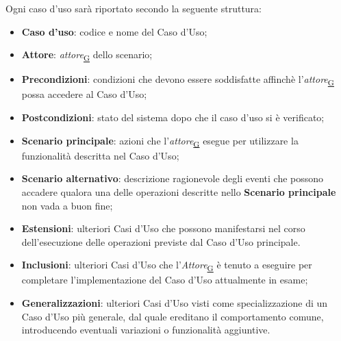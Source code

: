 ﻿\documentclass[a4paper,12pt]{article}
\begin{document}
{{      Ogni caso d'uso sarà riportato secondo la seguente struttura:
      \begin{itemize}
          \item \textbf{Caso d'uso}: codice e nome del Caso d'Uso;
          \item \textbf{Attore}: \textit{attore}\textsubscript{\href{https://atlasteam9.github.io/Atlas/glossario.html\#Attore}{G}} dello scenario;
          \item \textbf{Precondizioni}: condizioni che devono essere soddisfatte affinchè l'\textit{attore}\textsubscript{\href{https://atlasteam9.github.io/Atlas/glossario.html\#Attore}{G}} possa accedere al Caso d'Uso;
          \item \textbf{Postcondizioni}: stato del sistema dopo che il caso d'uso si è verificato;
          \item \textbf{Scenario principale}: azioni che l'\textit{attore}\textsubscript{\href{https://atlasteam9.github.io/Atlas/glossario.html\#Attore}{G}} esegue per utilizzare la funzionalità descritta nel Caso d'Uso;
          \item \textbf{Scenario alternativo}: descrizione ragionevole degli eventi che possono accadere qualora una delle operazioni descritte nello \textbf{Scenario principale} non vada a buon fine;
          \item \textbf{Estensioni}: ulteriori Casi d'Uso che possono manifestarsi nel corso dell'esecuzione delle operazioni previste dal Caso d'Uso principale.
          \item \textbf{Inclusioni}: ulteriori Casi d'Uso che l'\textit{Attore}\textsubscript{\href{https://atlasteam9.github.io/Atlas/glossario.html\#Attore}{G}} è tenuto a eseguire per completare l'implementazione del Caso d'Uso attualmente in esame;
          \item \textbf{Generalizzazioni}: ulteriori Casi d'Uso visti come specializzazione di un Caso d'Uso più generale, dal quale ereditano il comportamento comune, introducendo eventuali variazioni o funzionalità aggiuntive.
      \end{itemize}

}}
\end{document}
